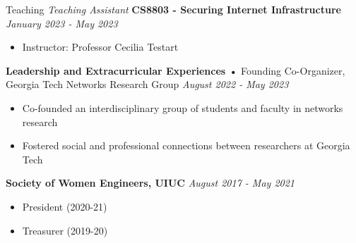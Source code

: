 \documentclass{resume} %
\begin{document}
\begin{rSection}{Teaching}
	{\emph{Teaching Assistant} \bf CS8803 - Securing Internet Infrastructure} \hfill{\em January 2023 - May 2023}
	\vspace{-2mm}
	\begin{itemize}
		\item Instructor: Professor Cecilia Testart
	\end{itemize}
		
\end{rSection}
	\begin{rSection}{\bf Leadership and Extracurricular Experiences}
	\textbf{•} Founding Co-Organizer, Georgia Tech Networks Research Group \hfill{\em August 2022 - May 2023}
	\begin{itemize}
		\item Co-founded an interdisciplinary group of students and faculty in networks research
		\item Fostered social and professional connections between researchers at Georgia Tech
	\end{itemize}
	
	{\bf Society of Women Engineers, UIUC} \hfill{\em August 2017 - May 2021}
	\vspace{-2mm}
	\begin{itemize}
		\item President (2020-21)
		\item Treasurer (2019-20)%
	\end{itemize}
		
\end{rSection}
\end{document}
